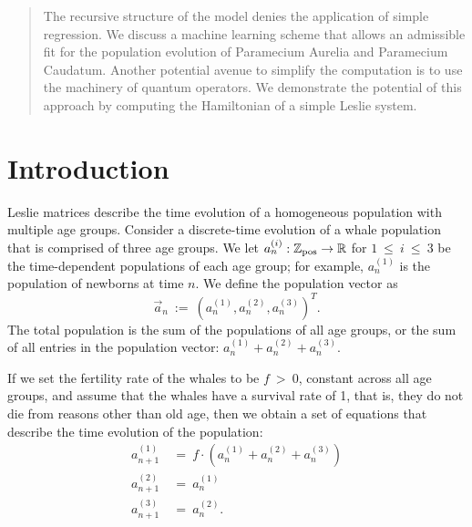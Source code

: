 \documentclass[11pt,reqno]{amsart}
\numberwithin{equation}{section}
\theoremstyle{plain}
\begin{document}
\begin{abstract}
The recursive structure of the model denies the application of simple regression. We discuss a machine learning scheme that allows an admissible fit for the population evolution of Paramecium Aurelia and Paramecium Caudatum. Another potential avenue to simplify the computation is to use the machinery of quantum operators. We demonstrate the potential of this approach by computing the Hamiltonian of a simple Leslie system. 

\end{abstract}

\tableofcontents


\section{Introduction}\label{sec:intro}

Leslie matrices describe the time evolution of a homogeneous population with multiple age groups. Consider a discrete-time evolution of a whale population that is comprised of three age groups. We let $a^{(i)}_n:\mathbb Z_{\rm pos} \rightarrow \mathbb R$ for $1 \ \leq \  i \ \leq \  3$ be the time-dependent populations of each age group; for example, $a_n^{(1)}$ is the population of newborns at time $n$. We define the population vector as 
\begin{equation}
    \vec a_n \ := \ (a^{(1)}_n, a^{(2)}_n, a^{(3)}_n)^T.
\end{equation}
The total population is the sum of the populations of all age groups, or the sum of all entries in the population vector: $a^{(1)}_n + a^{(2)}_n + a^{(3)}_n$. 

If we set the fertility rate of the whales to be $f \ > \  0$, constant across all age groups, and assume that the whales have a survival rate of 1, that is, they do not die from reasons other than old age, then we obtain a set of equations that describe the time evolution of the population:
\begin{align}
    a^{(1)}_{n + 1} \ &= \ f\cdot(a^{(1)}_n + a^{(2)}_n + a^{(3)}_n) 
    \nonumber \\ 
    a^{(2)}_{n + 1} \ &= \ a^{(1)}_n \\
    a^{(3)}_{n + 1} \ &= \ a^{(2)}_n. \nonumber
\end{align}
\end{document}
